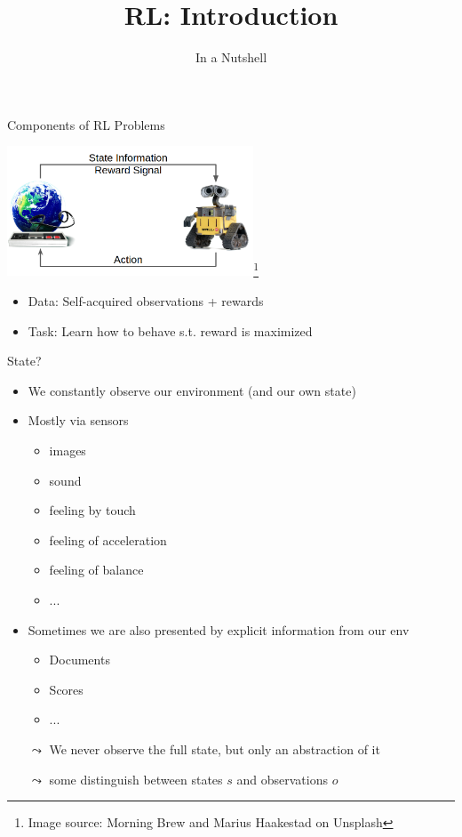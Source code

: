 \documentclass[aspectratio=169]{../latex_main/tntbeamer}  %
\title[ML-RL: Big Picture]{RL: Introduction}
\subtitle{In a Nutshell}
\begin{document}
	
\maketitle

\begin{frame}[c]{Components of RL Problems}
	
	\centering
	\includegraphics[width=0.55\textwidth]{images/rl_comic.png}\footnote{Image source: Morning Brew and Marius Haakestad on Unsplash}
	
	\bigskip
	
	\begin{itemize}
		\item Data: Self-acquired observations + rewards
		\item Task: Learn how to behave s.t. reward is maximized
	\end{itemize}	
	
\end{frame}
\begin{frame}[c]{State?}
	
	\begin{itemize}
		\item We constantly observe our environment (and our own state)
		\item Mostly via sensors
		\begin{itemize}
			\item images
			\item sound
			\item feeling by touch
			\item feeling of acceleration
			\item feeling of balance
			\item ...
		\end{itemize}
		\pause
		\smallskip
		\item Sometimes we are also presented by explicit information from our env
		\begin{itemize}
			\item Documents
			\item Scores
			\item ...
		\end{itemize}
		\pause
		\smallskip
		\item[$\leadsto$] We never observe the full state, but only an abstraction of it
		\item[$\leadsto$] some distinguish between states $s$ and observations $o$
	\end{itemize}
	
	
\end{frame}
\end{document}
